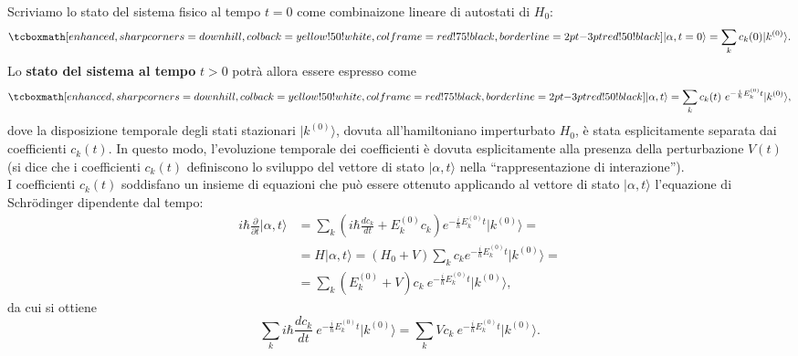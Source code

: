 \documentclass[a4paper,12pt,oneside]{book}
\begin{document}
Scriviamo lo stato del sistema fisico al tempo $t=0$ come combinaizone lineare di autostati di $H_0$:
	\begin{equation}
		\tcboxmath[enhanced, sharp corners=downhill, colback=yellow!50!white, colframe=red!75!black, borderline={2pt}{-3pt}{red!50!black}]{
			\vert \alpha ,t=0  \rangle = \sum _k c_k (0) \vert k ^{(0)} \rangle .
			}
	\label{eq:cap15_1}
	\end{equation}
Lo \textbf{stato del sistema al tempo} $t>0$ potrà allora essere espresso come
	\begin{equation}
		\tcboxmath[enhanced, sharp corners=downhill, colback=yellow!50!white, colframe=red!75!black, borderline={2pt}{-3pt}{red!50!black}]{
			\vert \alpha ,t  \rangle = \sum _k c_k (t)\ e^{-\frac{i}{\hbar}E_k ^{(0)} t } \vert k ^{(0)} \rangle ,
			}
	\label{eq:cap15_2}
	\end{equation}
dove la disposizione temporale degli stati stazionari $\vert k ^{(0)} \rangle$, dovuta all'hamiltoniano imperturbato $H_0$, è stata esplicitamente separata dai coefficienti $c_k {(t)}$. In questo modo, l'evoluzione temporale dei coefficienti è dovuta esplicitamente alla presenza della perturbazione $V(t)$  (si dice che i coefficienti $c_k (t)$ definiscono lo sviluppo del vettore di stato $\vert \alpha , t \rangle $ nella ``rappresentazione di interazione'').\\

I coefficienti $c_k (t)$ soddisfano un insieme di equazioni che può essere ottenuto applicando al vettore di stato $\vert \alpha , t \rangle $ l'equazione di Schr\"{o}dinger dipendente dal tempo:
	\begin{align}
		i\hbar \frac{\partial}{\partial t} \vert \alpha , t \rangle &= \sum _ k \left( i\hbar \frac{dc_k}{dt}+ E_k ^{(0)} c_k\right)e^{-\frac{i}{\hbar}E_k ^{(0)} t } \vert k ^{(0)} \rangle =\nonumber \\
		&=  H\vert \alpha , t \rangle  = \left( H_0 + V\right)\sum _k c_ke^{-\frac{i}{\hbar}E_k ^{(0)} t } \vert k ^{(0)} \rangle  = \nonumber \\
		&=   \sum _k \left( E_k ^{(0)}+ V\right)c_k\ e^{-\frac{i}{\hbar}E_k ^{(0)} t } \vert k ^{(0)} \rangle ,
	\end{align}
da cui si ottiene
\begin{equation}
\sum _ k i\hbar \frac{dc_k}{dt} \ e^{-\frac{i}{\hbar}E_k ^{(0)} t } \vert k ^{(0)} \rangle = \sum _ k V c_k\ e^{-\frac{i}{\hbar}E_k ^{(0)} t } \vert k ^{(0)} \rangle .
\end{equation}\\
\end{document}
